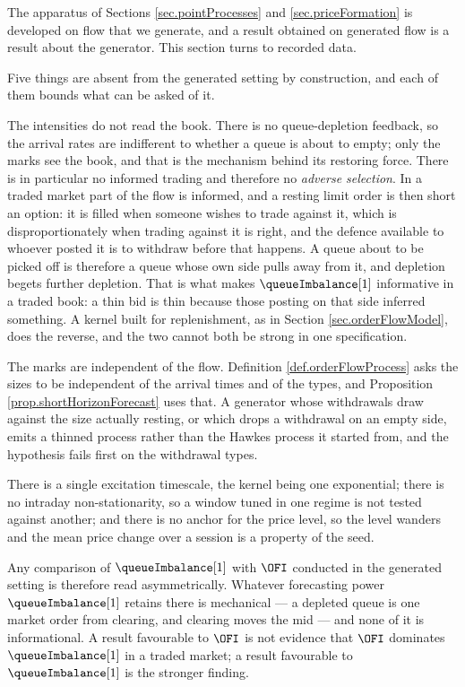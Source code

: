 The apparatus of Sections \ref{sec.pointProcesses} and \ref{sec.priceFormation} is developed
on flow that we generate, and a result obtained on generated flow is a result about the
generator.
This section turns to recorded data.

Five things are absent from the generated setting by construction, and each of them bounds
what can be asked of it.

The intensities do not read the book.
There is no queue-depletion feedback, so the arrival rates are indifferent to whether a queue
is about to empty; only the marks see the book, and that is the mechanism behind its
restoring force.
There is in particular no informed trading and therefore no \emph{adverse selection}.
In a traded market part of the flow is informed, and a resting limit order is then short an
option: it is filled when someone wishes to trade against it, which is disproportionately
when trading against it is right, and the defence available to whoever posted it is to
withdraw before that happens.
A queue about to be picked off is therefore a queue whose own side pulls away from it, and
depletion begets further depletion.
That is what makes $\queueImbalance[1]$ informative in a traded book:
a thin bid is thin because those posting on that side inferred something.
A kernel built for replenishment, as in Section \ref{sec.orderFlowModel}, does the reverse,
and the two cannot both be strong in one specification.

The marks are independent of the flow.
Definition \ref{def.orderFlowProcess} asks the sizes to be independent of the arrival times
and of the types, and Proposition \ref{prop.shortHorizonForecast} uses that.
A generator whose withdrawals draw against the size actually resting, or which drops a
withdrawal on an empty side, emits a thinned process rather than the Hawkes process it
started from, and the hypothesis fails first on the withdrawal types.

There is a single excitation timescale, the kernel being one exponential;
there is no intraday non-stationarity, so a window tuned in one regime is not tested against
another;
and there is no anchor for the price level, so the level wanders and the mean price change
over a session is a property of the seed.

\begin{remark}\label{remark.asymmetricReading}
 Any comparison of $\queueImbalance[1]$ with $\OFI$ conducted in the generated setting is
 therefore read asymmetrically.
 Whatever forecasting power $\queueImbalance[1]$ retains there is mechanical ---
 a depleted queue is one market order from clearing, and clearing moves the mid ---
 and none of it is informational.
 A result favourable to $\OFI$ is not evidence that $\OFI$ dominates $\queueImbalance[1]$ in
 a traded market; a result favourable to $\queueImbalance[1]$ is the stronger finding.
\end{remark}

